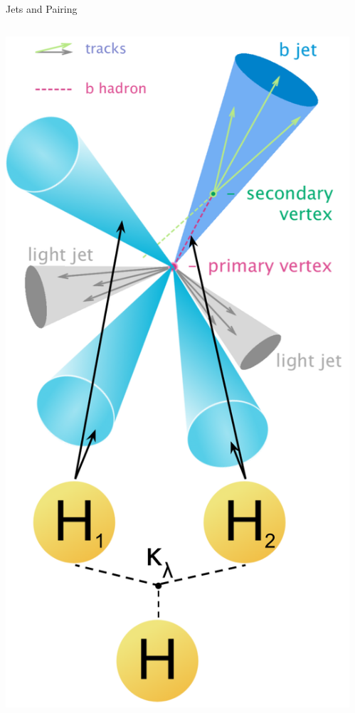 \documentclass[10pt, aspectratio=169]{beamer}
\begin{document}
{\begin{frame}{Jets and Pairing}
\begin{columns}[onlytextwidth]
\begin{column}{0.25\textwidth}
      \includegraphics[width=\linewidth]{images/jets_and_pairing.png}
    \end{column}
​  \end{columns}
\end{frame}
}
\end{document}

